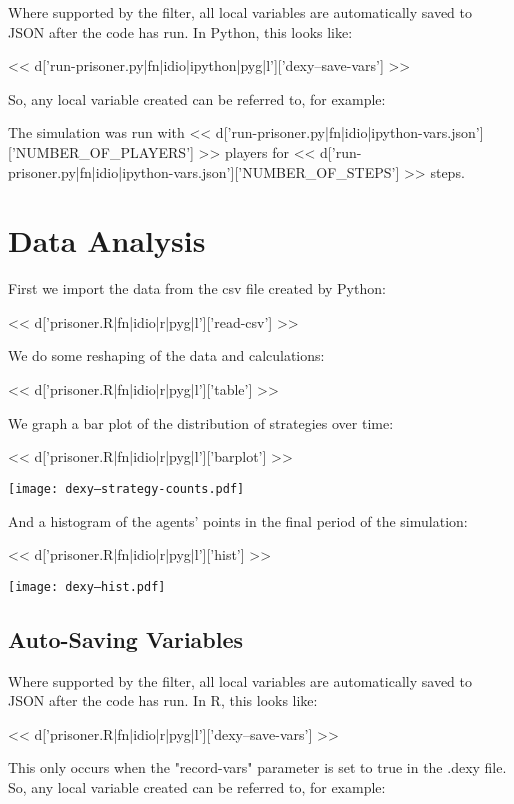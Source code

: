 \documentclass[a4paper]{tufte-handout}
\begin{document}
Where supported by the filter, all local variables are automatically saved to
JSON after the code has run. In Python, this looks like:

<< d['run-prisoner.py|fn|idio|ipython|pyg|l']['dexy--save-vars'] >>

So, any local variable created can be referred to, for example:

\sffamily

The simulation was run with
<< d['run-prisoner.py|fn|idio|ipython-vars.json']['NUMBER_OF_PLAYERS'] >> players for
<< d['run-prisoner.py|fn|idio|ipython-vars.json']['NUMBER_OF_STEPS'] >> steps.

\normalfont

\section{Data Analysis}

First we import the data from the csv file created by Python:

<< d['prisoner.R|fn|idio|r|pyg|l']['read-csv'] >>

We do some reshaping of the data and calculations:

<< d['prisoner.R|fn|idio|r|pyg|l']['table'] >>

We graph a bar plot of the distribution of strategies over time:

<< d['prisoner.R|fn|idio|r|pyg|l']['barplot'] >>

\texttt{[image: dexy--strategy-counts.pdf]}

And a histogram of the agents' points in the final period of the simulation:

<< d['prisoner.R|fn|idio|r|pyg|l']['hist'] >>

\texttt{[image: dexy--hist.pdf]}

\subsection{Auto-Saving Variables}

Where supported by the filter, all local variables are automatically saved to
JSON after the code has run. In R, this looks like:

<< d['prisoner.R|fn|idio|r|pyg|l']['dexy--save-vars'] >>

This only occurs when the "record-vars" parameter is set to true in the .dexy
file. So, any local variable created can be referred to, for example:
\end{document}
